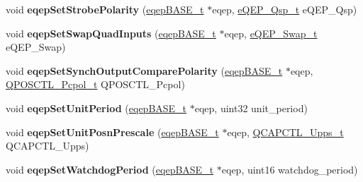 \begin{DoxyCompactItemize}
\item 
\mbox{\label{group__eQEP_ga50a5b6251f3f98f17f99e91693c7d4c0}} 
void {\bfseries eqep\+Set\+Strobe\+Polarity} (\mbox{\hyperlink{reg__eqep_8h_a794db63555812863c39c5d214fd4f215}{eqep\+B\+A\+S\+E\+\_\+t}} $\ast$eqep, \mbox{\hyperlink{eqep_8h_a1830a9053a06aac231ccfb0a04f40531}{e\+Q\+E\+P\+\_\+\+Qsp\+\_\+t}} e\+Q\+E\+P\+\_\+\+Qsp)
\item 
\mbox{\label{group__eQEP_ga12a51d0d99bca132cdb2d0cdf59f67ad}} 
void {\bfseries eqep\+Set\+Swap\+Quad\+Inputs} (\mbox{\hyperlink{reg__eqep_8h_a794db63555812863c39c5d214fd4f215}{eqep\+B\+A\+S\+E\+\_\+t}} $\ast$eqep, \mbox{\hyperlink{eqep_8h_a519296c72cbf00c495252d19cedf77cb}{e\+Q\+E\+P\+\_\+\+Swap\+\_\+t}} e\+Q\+E\+P\+\_\+\+Swap)
\item 
\mbox{\label{group__eQEP_gaf189ca637f7f8a80d9dd16de1ccb00ef}} 
void {\bfseries eqep\+Set\+Synch\+Output\+Compare\+Polarity} (\mbox{\hyperlink{reg__eqep_8h_a794db63555812863c39c5d214fd4f215}{eqep\+B\+A\+S\+E\+\_\+t}} $\ast$eqep, \mbox{\hyperlink{eqep_8h_ae3cf3203447fa7385a954d34a60ccc54}{Q\+P\+O\+S\+C\+T\+L\+\_\+\+Pcpol\+\_\+t}} Q\+P\+O\+S\+C\+T\+L\+\_\+\+Pcpol)
\item 
\mbox{\label{group__eQEP_ga5da43d6578be90b58a004e624c5ba10a}} 
void {\bfseries eqep\+Set\+Unit\+Period} (\mbox{\hyperlink{reg__eqep_8h_a794db63555812863c39c5d214fd4f215}{eqep\+B\+A\+S\+E\+\_\+t}} $\ast$eqep, uint32 unit\+\_\+period)
\item 
\mbox{\label{group__eQEP_ga11f1a278ede53983bb40d05d40a7c42c}} 
void {\bfseries eqep\+Set\+Unit\+Posn\+Prescale} (\mbox{\hyperlink{reg__eqep_8h_a794db63555812863c39c5d214fd4f215}{eqep\+B\+A\+S\+E\+\_\+t}} $\ast$eqep, \mbox{\hyperlink{eqep_8h_a4d46fc2c96c979ef396d19f283b92be0}{Q\+C\+A\+P\+C\+T\+L\+\_\+\+Upps\+\_\+t}} Q\+C\+A\+P\+C\+T\+L\+\_\+\+Upps)
\item 
\mbox{\label{group__eQEP_ga573fa33b82caed37b86c105376684702}} 
void {\bfseries eqep\+Set\+Watchdog\+Period} (\mbox{\hyperlink{reg__eqep_8h_a794db63555812863c39c5d214fd4f215}{eqep\+B\+A\+S\+E\+\_\+t}} $\ast$eqep, uint16 watchdog\+\_\+period)
\item 
\mbox{\label{group__eQEP_gaf0857d9a993355d967356b616d0082c7}} 

\end{DoxyCompactItemize}
